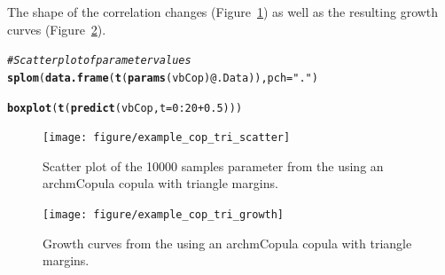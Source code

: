 \documentclass[a4paper,english,10pt]{article}\usepackage[]{graphicx}\usepackage[]{color}
\makeatletter
\newcommand{\hlnum}[1]{\textcolor[rgb]{0.686,0.059,0.569}{#1}}%
\newcommand{\hlstr}[1]{\textcolor[rgb]{0.192,0.494,0.8}{#1}}%
\newcommand{\hlcom}[1]{\textcolor[rgb]{0.678,0.584,0.686}{\textit{#1}}}%
\newcommand{\hlopt}[1]{\textcolor[rgb]{0,0,0}{#1}}%
\newcommand{\hlstd}[1]{\textcolor[rgb]{0.345,0.345,0.345}{#1}}%
\newcommand{\hlkwc}[1]{\textcolor[rgb]{0.333,0.667,0.333}{#1}}%
\newcommand{\hlkwd}[1]{\textcolor[rgb]{0.737,0.353,0.396}{\textbf{#1}}}%
\newenvironment{kframe}{%
 \def\at@end@of@kframe{}%
 \ifinner\ifhmode%
  \def\at@end@of@kframe{\end{minipage}}%
  \begin{minipage}{\columnwidth}%
 \fi\fi%
 \def\FrameCommand##1{\hskip\@totalleftmargin \hskip-\fboxsep
 \colorbox{shadecolor}{##1}\hskip-\fboxsep
     \hskip-\linewidth \hskip-\@totalleftmargin \hskip\columnwidth}%
 \MakeFramed {\advance\hsize-\width
   \@totalleftmargin\z@ \linewidth\hsize
   \@setminipage}}%
 {\par\unskip\endMakeFramed%
 \at@end@of@kframe}
\newenvironment{knitrout}{}{} %
\makeatother
\begin{document}
The shape of the correlation changes (Figure~\ref{fig:plot_cop_tri_scatter}) as well as the resulting growth curves (Figure~\ref{fig:plot_cop_tri_growth}). 

\begin{knitrout}
\color{fgcolor}\begin{kframe}
\begin{alltt}
\hlcom{# Scatter plot of parameter values}
\hlkwd{splom}\hlstd{(}\hlkwd{data.frame}\hlstd{(}\hlkwd{t}\hlstd{(}\hlkwd{params}\hlstd{(vbCop)}\hlopt{@}\hlkwc{.Data}\hlstd{)),} \hlkwc{pch} \hlstd{=} \hlstr{"."}\hlstd{)}
\end{alltt}
\end{kframe}
\end{knitrout}


\begin{knitrout}
\color{fgcolor}\begin{kframe}
\begin{alltt}
\hlkwd{boxplot}\hlstd{(}\hlkwd{t}\hlstd{(}\hlkwd{predict}\hlstd{(vbCop,} \hlkwc{t} \hlstd{=} \hlnum{0}\hlopt{:}\hlnum{20} \hlopt{+} \hlnum{0.5}\hlstd{)))}
\end{alltt}
\end{kframe}
\end{knitrout}


\begin{figure}[h]
\begin{knitrout}
\color{fgcolor}

{\centering \texttt{[image: figure/example\_cop\_tri\_scatter]} 

}



\end{knitrout}

\caption{Scatter plot of the 10000 samples parameter from the using an archmCopula copula with triangle margins.}
\label{fig:plot_cop_tri_scatter}
\end{figure}

\begin{figure}[h]
\begin{knitrout}
\color{fgcolor}

{\centering \texttt{[image: figure/example\_cop\_tri\_growth]} 

}



\end{knitrout}

\caption{Growth curves from the using an archmCopula copula with triangle margins.}
\label{fig:plot_cop_tri_growth}
\end{figure}
\end{document}
